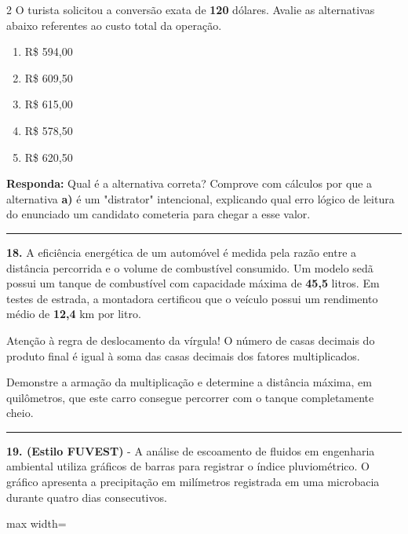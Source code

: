 \documentclass[twoside, 10pt, a4paper]{article}
\newlength{\espacoPreQuestao}
\begin{document}
\begin{multicols*}{2}
O turista solicitou a conversão exata de \textbf{120} dólares. Avalie as alternativas abaixo referentes ao custo total da operação.
\begin{enumerate}[label=\alph*)]
    \item R\$ 594,00
    \item R\$ 609,50
    \item R\$ 615,00
    \item R\$ 578,50
    \item R\$ 620,50
\end{enumerate}
\begin{boxresponda}
\textbf{Responda:} Qual é a alternativa correta? Comprove com cálculos por que a alternativa \textbf{a)} é um "distrator" intencional, explicando qual erro lógico de leitura do enunciado um candidato cometeria para chegar a esse valor.
\end{boxresponda}
\par\vspace{0.0cm}

\noindent\textcolor{CorLinha}{\rule{\linewidth}{0.5pt}} 
\par\vspace{\espacoPreQuestao}
\textbf{18.} A eficiência energética de um automóvel é medida pela razão entre a distância percorrida e o volume de combustível consumido. Um modelo sedã possui um tanque de combustível com capacidade máxima de \textbf{45,5} litros. Em testes de estrada, a montadora certificou que o veículo possui um rendimento médio de \textbf{12,4} km por litro.
\begin{boxdica}
Atenção à regra de deslocamento da vírgula! O número de casas decimais do produto final é igual à soma das casas decimais dos fatores multiplicados.
\end{boxdica}
Demonstre a armação da multiplicação e determine a distância máxima, em quilômetros, que este carro consegue percorrer com o tanque completamente cheio.
\par\vspace{0.0cm}

\noindent\textcolor{CorLinha}{\rule{\linewidth}{0.5pt}} 
\par\vspace{0.05cm}
\textbf{19. (Estilo FUVEST)} - A análise de escoamento de fluidos em engenharia ambiental utiliza gráficos de barras para registrar o índice pluviométrico. O gráfico apresenta a precipitação em milímetros registrada em uma microbacia durante quatro dias consecutivos.
\begin{center}
\begin{adjustbox}{max width=\linewidth}
\end{adjustbox}
\end{center}
\end{multicols*}
\end{document}

